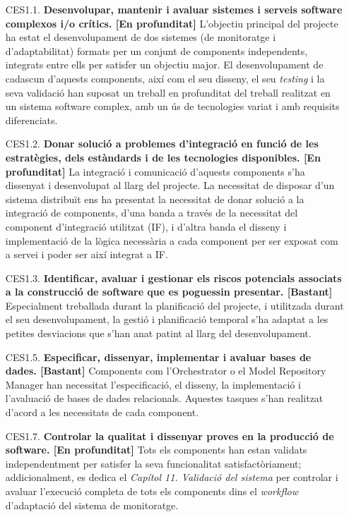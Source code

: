 \begin{enumerate}
\item [CES1.1.] \textbf{Desenvolupar, mantenir i avaluar sistemes i serveis software complexos i/o crítics. [En profunditat]}
\subitem L'objectiu principal del projecte ha estat el desenvolupament de dos sistemes (de monitoratge i d'adaptabilitat) formats per un conjunt de components independents, integrats entre ells per satisfer un objectiu major. El desenvolupament de cadascun d'aquests components, així com el seu disseny, el seu \textit{testing} i la seva validació han suposat un treball en profunditat del treball realitzat en un sistema software complex, amb un ús de tecnologies variat i amb requisits diferenciats.
\item [CES1.2.] \textbf{Donar solució a problemes d'integració en funció de les estratègies, dels estàndards i de les tecnologies disponibles. [En profunditat]}
\subitem La integració i comunicació d'aquests components s'ha dissenyat i desenvolupat al llarg del projecte. La necessitat de disposar d'un sistema distribuït ens ha presentat la necessitat de donar solució a la integració de components, d'una banda a través de la necessitat del component d'integració utilitzat (IF), i d'altra banda el disseny i implementació de la lògica necessària a cada component per ser exposat com a servei i poder ser així integrat a IF.
\item [CES1.3.] \textbf{Identificar, avaluar i gestionar els riscos potencials associats a la construcció de software que es poguessin presentar. [Bastant]}
\subitem Especialment treballada durant la planificació del projecte, i utilitzada durant el seu desenvolupament, la gestió i planificació temporal s'ha adaptat a les petites desviacions que s'han anat patint al llarg del desenvolupament.
\item [CES1.5.] \textbf{Especificar, dissenyar, implementar i avaluar bases de dades.  [Bastant]}
\subitem Components com l'Orchestrator o el Model Repository Manager han necessitat l'especificació, el disseny, la implementació i l'avaluació de bases de dades relacionals. Aquestes tasques s'han realitzat d'acord a les necessitats de cada component.
\item [CES1.7.] \textbf{Controlar la qualitat i dissenyar proves en la producció de software. [En profunditat]}
\subitem Tots els components han estan validats independentment per satisfer la seva funcionalitat satisfactòriament; addicionalment, es dedica el \textit{Capítol 11. Validació del sistema} per controlar i avaluar l'execució completa de tots els components dins el \textit{workflow} d'adaptació del sistema de monitoratge.

\end{enumerate}

